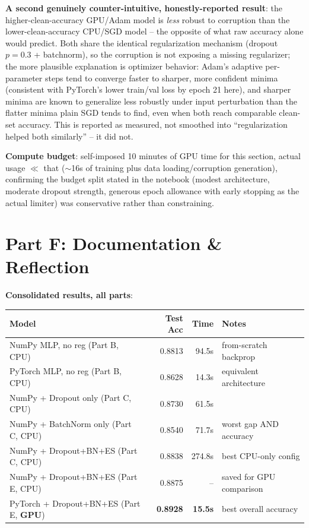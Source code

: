 \documentclass[11pt,a4paper]{article}
\begin{document}
\textbf{A second genuinely counter-intuitive, honestly-reported result}: the higher-clean-accuracy
GPU/Adam model is \emph{less} robust to corruption than the lower-clean-accuracy CPU/SGD model --
the opposite of what raw accuracy alone would predict. Both share the identical regularization
mechanism (dropout $p{=}0.3$ + batchnorm), so the corruption is not exposing a missing
regularizer; the more plausible explanation is optimizer behavior: Adam's adaptive per-parameter
steps tend to converge faster to sharper, more confident minima (consistent with PyTorch's lower
train/val loss by epoch 21 here), and sharper minima are known to generalize less robustly under
input perturbation than the flatter minima plain SGD tends to find, even when both reach
comparable clean-set accuracy. This is reported as measured, not smoothed into ``regularization
helped both similarly'' -- it did not.

\textbf{Compute budget}: self-imposed 10 minutes of GPU time for this section, actual usage
$\ll$ that ($\sim$16s of training plus data loading/corruption generation), confirming the
budget split stated in the notebook (modest architecture, moderate dropout strength, generous
epoch allowance with early stopping as the actual limiter) was conservative rather than
constraining.

\section*{Part F: Documentation \& Reflection}

\textbf{Consolidated results, all parts}:

\begin{table}[H]
\centering
\begin{tabular}{lrrl}
\toprule
\textbf{Model} & \textbf{Test Acc} & \textbf{Time} & \textbf{Notes} \\
\midrule
NumPy MLP, no reg (Part B, CPU) & 0.8813 & 94.5s & from-scratch backprop \\
PyTorch MLP, no reg (Part B, CPU) & 0.8628 & 14.3s & equivalent architecture \\
NumPy + Dropout only (Part C, CPU) & 0.8730 & 61.5s & \\
NumPy + BatchNorm only (Part C, CPU) & 0.8540 & 71.7s & worst gap AND accuracy \\
NumPy + Dropout+BN+ES (Part C, CPU) & 0.8838 & 274.8s & best CPU-only config \\
NumPy + Dropout+BN+ES (Part E, CPU) & 0.8875 & -- & saved for GPU comparison \\
PyTorch + Dropout+BN+ES (Part E, \textbf{GPU}) & \textbf{0.8928} & \textbf{15.5s} & best overall accuracy \\
\bottomrule
\end{tabular}
\end{table}
\end{document}
